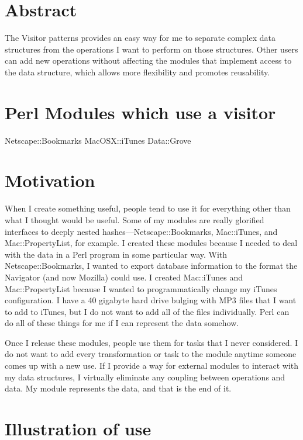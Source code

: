 
    \section{Abstract}

The Visitor patterns provides an easy way for me to
separate complex data structures from the operations I
want to perform on those structures.  Other users can add
new operations without affecting the modules that implement
access to the data structure, which allows more flexibility
and promotes reusability.

	\section{Perl Modules which use a visitor}
	
Netscape::Bookmarks
MacOSX::iTunes
Data::Grove

   \section{Motivation}

When I create something useful, people tend to use it for
everything other than what I thought would be useful.  Some
of my modules are really glorified interfaces to deeply nested
hashes---Netscape::Bookmarks, Mac::iTunes, and Mac::PropertyList,
for example.  I created these modules because I needed to deal
with the data in a Perl program in some particular way.  With
Netscape::Bookmarks, I wanted to export database information
to the format the Navigator (and now Mozilla) could use.
I created Mac::iTunes and Mac::PropertyList because I wanted
to programmatically change my iTunes configuration.  I have
a 40 gigabyte hard drive bulging with MP3 files that I want
to add to iTunes, but I do not want to add all of the files
individually.  Perl can do all of these things for me if I
can represent the data somehow.

Once I release these modules, people use them for tasks that
I never considered.  I do not want to add every transformation
or task to the module anytime someone comes up with a new use.
If I provide a way for external modules to interact with my
data structures, I virtually eliminate any coupling between
operations and data.  My module represents the data, and that
is the end of it.

   \section{Illustration of use}

